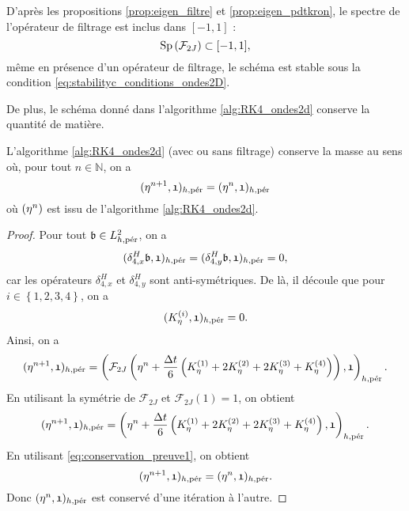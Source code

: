 D'après les propositions \ref{prop:eigen_filtre} et \ref{prop:eigen_pdtkron}, le spectre de l'opérateur de filtrage est inclus dans $[-1,1]$ :
\begin{equation}
\Sp \left( \mathcal{F}_{2J} \right) \subset [-1,1],
\end{equation}
même en présence d'un opérateur de filtrage, le schéma est stable sous la condition \eqref{eq:stabilityc_conditions_ondes2D}.


De plus, le schéma donné dans l'algorithme \ref{alg:RK4_ondes2d} conserve la quantité de matière.
\begin{proposition}
L'algorithme \ref{alg:RK4_ondes2d} (avec ou sans filtrage) conserve la masse au sens où, pour tout $n \in \mathbb{N}$, on a 
\begin{equation}
(\etafrak^{n+1} , \mathfrak{1})_{h,\per} = (\etafrak^{n} , \mathfrak{1})_{h,\per}
\end{equation}
où $(\etafrak^n)$ est issu de l'algorithme \ref{alg:RK4_ondes2d}.
\end{proposition}

\begin{proof}
Pour tout $\mathfrak{b} \in L^2_{h,\per}$, on a 
\begin{equation}
(\delta_{4,x}^H \mathfrak{b}, \mathfrak{1})_{h,\per} = (\delta_{4,y}^H \mathfrak{b}, \mathfrak{1})_{h,\per} = 0,
\end{equation}
car les opérateurs $\delta_{4,x}^H$ et $\delta_{4,y}^H$ sont anti-symétriques. De là, il découle que pour $i \in \left\lbrace 1,2,3,4 \right\rbrace$, on a 
\begin{equation}
(K_{\eta}^{(i)}, \mathfrak{1})_{h,\per} = 0.
\label{eq:conservation_preuve1}
\end{equation}
Ainsi, on a
\begin{equation}
(\etafrak^{n+1}, \mathfrak{1})_{h,\per} = \left( \mathcal{F}_{2J}\left( \etafrak^n  + \dfrac{\Delta t}{6} \left( K^{(1)}_{\eta} + 2 K^{(2)}_{\eta} + 2 K^{(3)}_{\eta} + K^{(4)}_{\eta} \right) \right) , \mathfrak{1} \right)_{h,\per}.
\end{equation}
En utilisant la symétrie de $\mathcal{F}_{2J}$ et $\mathcal{F}_{2J}(\mathfrak{1}) = \mathfrak{1}$, on obtient
\begin{equation}
(\etafrak^{n+1}, \mathfrak{1})_{h,\per} = \left( \etafrak^n  + \dfrac{\Delta t}{6} \left( K^{(1)}_{\eta} + 2 K^{(2)}_{\eta} + 2 K^{(3)}_{\eta} + K^{(4)}_{\eta} \right) , \mathfrak{1}\right)_{h,\per}.
\end{equation}
En utilisant \eqref{eq:conservation_preuve1}, on obtient
\begin{equation}
(\etafrak^{n+1} , \mathfrak{1})_{h,\per} = (\etafrak^{n} , \mathfrak{1})_{h,\per}.
\end{equation}
Donc $(\etafrak^n,\mathfrak{1})_{h,\per}$ est conservé d'une itération à l'autre.
\end{proof}









